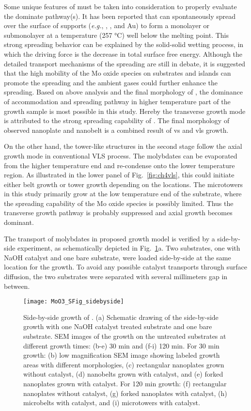 Some unique features of  must be taken into consideration to properly evaluate the dominate pathway(s). It has been reported that  can spontaneously spread over the surface of supports (\emph{e.g.}, , , and Au) to form a monolayer or submonolayer at a temperature (257 \si{\degreeCelsius}) well below the melting point.\cite{Leyrer1990} This strong spreading behavior can be explained by the solid-solid wetting process, in which the driving force is the decrease in total surface free energy.\cite{Leyrer1988} Although the detailed transport mechanisms of the spreading are still in debate, it is suggested that the high mobility of the Mo oxide species on substrates and  islands can promote the spreading and the ambient gases could further enhance the spreading.\cite{Gunther2000, Song2003} Based on above analysis and the final morphology of , the dominance of accommodation and spreading pathway in higher temperature part of the growth sample is most possible in this study. Hereby the transverse growth mode is attributed to the strong spreading capability of . The final morphology of observed nanoplate and nanobelt is a combined result of \gls{vs} and \gls{vls} growth. 

On the other hand, the tower-like structures in the second stage follow the axial growth mode in conventional VLS process. The molybdates can be evaporated from the higher temperature end and re-condense onto the lower temperature region. As illustrated in the lower panel of Fig.~\ref{fig:ch4vls}, this could initiate either belt growth or tower growth depending on the locations. The microtowers in this study primarily grow at the low temperature end of the substrate, where the spreading capability of the Mo oxide species is possibly limited. Thus the transverse growth pathway is probably suppressed and axial growth becomes dominant.

The transport of molybdates in proposed growth model is verified by a side-by-side experiment, as schematically depicted in Fig.~\ref{fig:ch4sbs}a. Two substrates, one with NaOH catalyst and one bare substrate, were loaded side-by-side at the same location for the growth. To avoid any possible catalyst transports through surface diffusion, the two substrates were separated with several millimeters gap in between. 

\begin{figure}[htb]
\centering
\texttt{[image: MoO3\_SFig\_sidebyside]}
\caption[Side-by-side growth of ]{Side-by-side growth of . (a) Schematic drawing of the side-by-side growth with one NaOH catalyst treated substrate and one bare substrate. SEM images of the growth on the untreated substrates at different growth times: (b-e) 30 min and (f-i) 120 min. For 30 min growth: (b) low magnification SEM image showing labeled growth areas with different morphologies, (c) rectangular nanoplates grown without catalyst, (d) nanobelts grown with catalyst, and (e) forked nanoplates grown with catalyst. For 120 min growth: (f) rectangular nanoplates without catalyst, (g) forked nanoplates with catalyst, (h) microbelts with catalyst, and (i) microtowers with catalyst.}
\label{fig:ch4sbs}
\end{figure}

